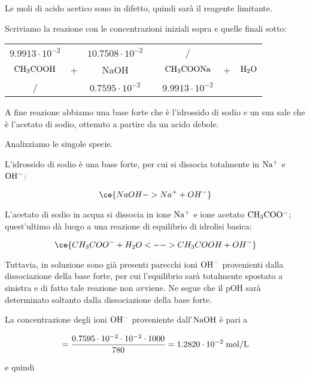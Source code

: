 Le moli di acido acetico sono in difetto, quindi sarà il reagente limitante.

Scriviamo la reazione con le concentrazioni iniziali sopra e quelle finali sotto:

\begin{center}
    \begin{tabular}{ccccccc}
        $9.9913 \cdot 10^{-2}$ & & $10.7508 \cdot 10^{-2}$ & & / &&\\
        $\rm CH_3COOH$ & + & NaOH & \ce{->} & $\rm CH_3COONa$ & + & $\rm H_2O$\\
        / & & $0.7595 \cdot 10^{-2}$ & & $9.9913 \cdot 10^{-2}$&&\\
    \end{tabular}
\end{center}

A fine reazione abbiamo una base forte che è l'idrossido di sodio e un sua sale che è l'acetato di sodio, ottenuto a partire da un acido debole.

Analizziamo le singole specie.

L'idrossido di sodio è una base forte, per cui si dissocia totalmente in $\rm Na^+$ e $\rm OH^-$:

\begin{equation*}
    \ce{NaOH -> Na^+ + OH^-}
\end{equation*}

L'acetato di sodio in acqua si dissocia in ione $\rm Na^+$ e ione acetato $\rm CH_3COO^-$; quest'ultimo dà luogo a una reazione di equilibrio di idrolisi basica:

\begin{equation*}
    \ce{CH_3COO^- + H_2O <--> CH_3COOH + OH^-}
\end{equation*}

Tuttavia, in soluzione sono già presenti parecchi ioni $\rm OH^-$ provenienti dalla dissociazione della base forte, per cui l'equilibrio sarà totalmente spostato a sinistra e di fatto tale reazione non avviene. Ne segue che il pOH sarà determinato soltanto dalla dissociazione della base forte.

La concentrazione degli ioni $\rm OH^-$ proveniente dall'$\rm NaOH$ è pari a

\begin{equation*}
    [\rm OH^-]=\frac{0.7595 \cdot 10^{-2} \cdot 10^{-2} \cdot 1000}{780}=1.2820 \cdot 10^{-2} \; \rm mol/L
\end{equation*}

e quindi

